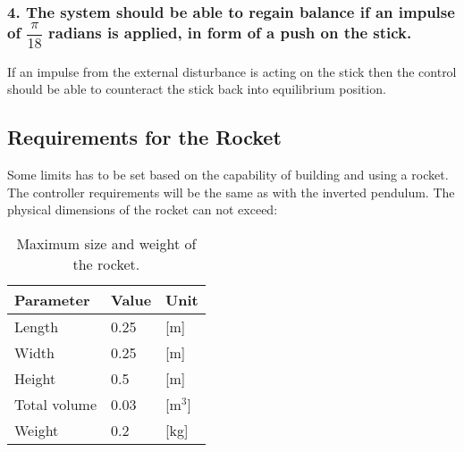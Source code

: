 \subsubsection*{4. The system should be able to regain balance if an impulse of $\dfrac{\pi}{18}$ radians is applied, in form of a push on the stick.} 
\forceindent If an impulse from the external disturbance is acting on the stick then the control should be able to counteract the stick back into equilibrium position.   



\subsection{Requirements for the Rocket}
Some limits has to be set based on the capability of building and using a rocket. The controller requirements will be the same as with the inverted pendulum.  
The physical dimensions of the rocket can not exceed:
\begin{table}[htbp]
\centering\begin{flushleft}
	\begin{flushleft}
		\begin{flushleft}
			\begin{flushleft}
				\begin{flushleft}
					\begin{flushleft}
						\begin{flushleft}
							\begin{flushleft}
								
							\end{flushleft}
						\end{flushleft}
					\end{flushleft}
				\end{flushleft}
			\end{flushleft}
		\end{flushleft}
	\end{flushleft}
\end{flushleft}
\begin{tabular}{lll}
\hline
Parameter    & Value & Unit  \\ \hline
Length       & 0.25  & [m]     \\
Width        & 0.25  & [m]     \\
Height       & 0.5   & [m]     \\
Total volume & 0.03  & [m$^3$] \\
Weight       & 0.2   & [kg]   
\end{tabular}

\caption{Maximum size and weight of the rocket.}
\label{RocketDimensions}
\end{table}

